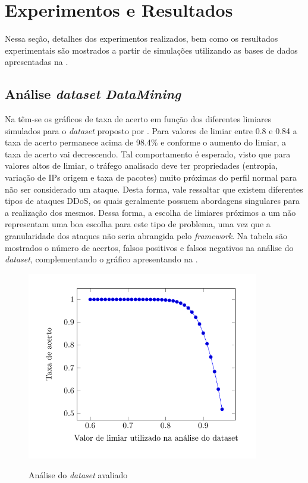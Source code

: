\chapter[Resultados]{Experimentos e Resultados}
\label{resultados}
Nessa seção, detalhes dos experimentos realizados, bem como os resultados experimentais são mostrados a partir de simulações utilizando as bases de dados apresentadas na .

\section{Análise \textit{dataset DataMining}}  
Na  têm-se os gráficos de taxa de acerto em função dos diferentes limiares simulados para o \textit{dataset} proposto por \cite{DataMining}. Para valores de limiar entre 0.8 e 0.84 a taxa de acerto permanece acima de 98.4\% e conforme o aumento do limiar, a taxa de acerto vai decrescendo. Tal comportamento é esperado, visto que para valores altos de limiar, o tráfego analisado deve ter propriedades (entropia, variação de IPs origem e taxa de pacotes) muito próximas do perfil normal para não ser considerado um ataque. Desta forma, vale ressaltar que existem diferentes tipos de ataques DDoS, os quais geralmente possuem abordagens singulares para a realização dos mesmos. Dessa forma, a escolha de limiares próximos a um não representam uma boa escolha para este tipo de problema, uma vez que a granularidade dos ataques não seria abrangida pelo \textit{framework}. Na tabela  são mostrados  o número de acertos, falsos positivos e falsos negativos na análise do \textit{dataset}, complementando o gráfico apresentando na .

 \begin{figure}[htb]
 	\centering
 	\caption{Análise do \textit{dataset} avaliado }
 	\includegraphics[width=0.9\textwidth]{figs/results80-95Mining.pdf}\\
 	\hspace{1.5cm}{Fonte: Elaborada pelo autor.}
 	\label{fig:ResultsMining}
 \end{figure}
 
